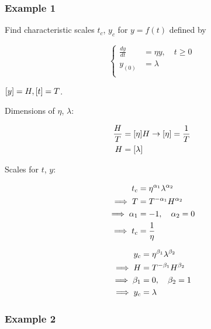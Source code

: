 \documentclass[12pt]{article}
\begin{document}
\subsubsection{Example 1}

Find characteristic scales $t_c$, $y_c$ for $y=f(t)$ defined by

\begin{equation}
  \left\{
  \begin{aligned}
    \frac{dy}{dt} &= \eta y, \quad t\ge0 \\
    y_{(0)} &= \lambda \\
  \end{aligned} \right.
\end{equation}

$[y] = H , [t]=T$.

Dimensions of $\eta$, $\lambda$:

\begin{equation}
  \begin{aligned}
    \frac{H}{T} &= [\eta]H \rightarrow [\eta]=\frac{1}{T} \\
    H &= [\lambda]
  \end{aligned}
\end{equation}

Scales for $t$, $y$:

\begin{equation}
  \begin{aligned}
    t_c &= \eta^{\alpha_1} \lambda^{\alpha_2} \\
    \implies T &= T^{-\alpha_1}H^{\alpha_2} \\
    \implies \alpha_1 &= -1,\quad \alpha_2 = 0 \\
    \implies t_c &= \frac{1}{\eta}\\
  \end{aligned}
\end{equation}

\begin{equation}
  \begin{aligned}
    y_c &= \eta^{\beta_1} \lambda^{\beta_2} \\
    \implies H &= T^{-\beta_1}H^{\beta_2} \\
    \implies \beta_1 &= 0,\quad \beta_2 = 1 \\
    \implies y_c &= \lambda
  \end{aligned}
\end{equation}

\subsubsection{Example 2}
\end{document}
